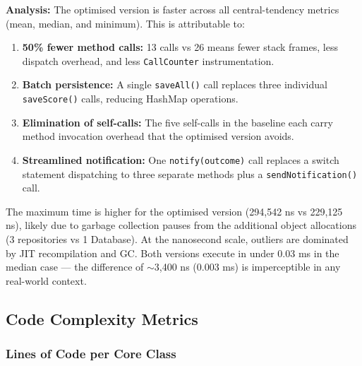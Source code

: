 \documentclass[12pt, a4paper]{article}
\begin{document}
\textbf{Analysis:} The optimised version is faster across all central-tendency metrics (mean, median, and minimum). This is attributable to:

\begin{enumerate}[nosep]
    \item \textbf{50\% fewer method calls:} 13 calls vs 26 means fewer stack frames, less dispatch overhead, and less \texttt{CallCounter} instrumentation.
    \item \textbf{Batch persistence:} A single \texttt{saveAll()} call replaces three individual \texttt{saveScore()} calls, reducing HashMap operations.
    \item \textbf{Elimination of self-calls:} The five self-calls in the baseline each carry method invocation overhead that the optimised version avoids.
    \item \textbf{Streamlined notification:} One \texttt{notify(outcome)} call replaces a switch statement dispatching to three separate methods plus a \texttt{sendNotification()} call.
\end{enumerate}

The maximum time is higher for the optimised version (294{,}542 ns vs 229{,}125 ns), likely due to garbage collection pauses from the additional object allocations (3 repositories vs 1 Database). At the nanosecond scale, outliers are dominated by JIT recompilation and GC. Both versions execute in under 0.03 ms in the median case --- the difference of $\sim$3{,}400 ns (0.003 ms) is imperceptible in any real-world context.

\subsection{Code Complexity Metrics}

\subsubsection{Lines of Code per Core Class}
\end{document}
